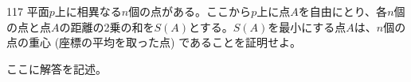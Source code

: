 \begin{prob}{117}{}{}
 平面$p$上に相異なる$n$個の点がある。ここから$p$上に点$A$を自由にとり、各$n$個の点と点$A$の距離の2乗の和を$S(A)$とする。$S(A)$を最小にする点$A$は、$n$個の点の重心 (座標の平均を取った点) であることを証明せよ。
\end{prob}
ここに解答を記述。